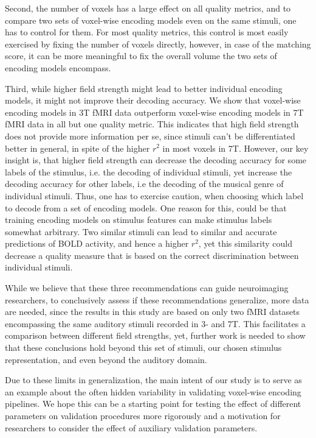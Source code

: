 Second, the number of voxels has a large effect on all quality metrics, and to compare two sets of voxel-wise encoding models even on the same stimuli, one has to control for them. For most quality metrics, this control is most easily exercised by fixing the number of voxels directly, however, in case of the matching score, it can be more meaningful to fix the overall volume the two sets of encoding models encompass.

Third, while higher field strength might lead to better individual encoding models, it might not improve their decoding accuracy. We show that voxel-wise encoding models in 3T f{MRI} data outperform voxel-wise encoding models in 7T f{MRI} data in all but one quality metric. This indicates that high field strength does not provide more information per se, since stimuli can't be differentiated better in general, in spite of the higher $r^{2}$ in most voxels in 7T. However, our key insight is, that higher field strength can decrease the decoding accuracy for some labels of the stimulus, i.e. the decoding of individual stimuli, yet increase the decoding accuracy for other labels, i.e the decoding of the musical genre of individual stimuli. Thus, one has to exercise caution, when choosing which label to decode from a set of encoding models. One reason for this, could be that training encoding models on stimulus features can make stimulus labels somewhat arbitrary. Two similar stimuli can lead to similar and accurate predictions of BOLD activity, and hence a higher $r^{2}$,  yet this similarity could decrease a quality measure that is based on the correct discrimination between individual stimuli.

While we believe that these three recommendations can guide neuroimaging researchers, to conclusively assess if these recommendations generalize, more data are needed, since the results in this study are based on only two f{MRI} datasets encompassing the same auditory stimuli recorded in 3- and 7T. This facilitates a comparison between different field strengths, yet, further work is needed to show that these conclusions hold beyond this set of stimuli, our chosen stimulus representation, and even beyond the auditory domain.

Due to these limits in generalization, the main intent of our study is to serve as an example about the often hidden variability in validating voxel-wise encoding pipelines.
We hope this can be a starting point for testing the effect of different parameters on validation procedures more rigorously and a motivation for researchers to consider the effect of auxiliary validation parameters.

